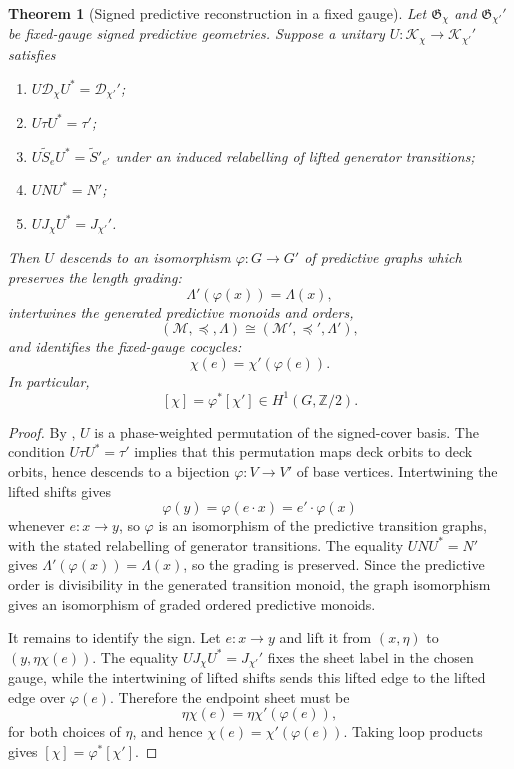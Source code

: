 \documentclass[11pt]{article}
\newtheorem{theorem}{Theorem}[section]
\theoremstyle{definition}
\theoremstyle{remark}
\newcommand{\Z}{\mathbb{Z}}
\newcommand{\Kh}{\mathcal{K}}
\newcommand{\M}{\mathcal{M}}
\newcommand{\Dd}{\mathcal{D}}
\begin{document}
\begin{theorem}[Signed predictive reconstruction in a fixed gauge]
\label{thm:reconstruction}
Let $\mathfrak G_\chi$ and $\mathfrak G_{\chi'}'$ be fixed-gauge signed
predictive geometries.  Suppose a unitary $U:\Kh_\chi\to\Kh_{\chi'}'$ satisfies
\begin{enumerate}[label=\textup{(R\arabic*)},leftmargin=2.6em]
\item $U\Dd_\chi U^*=\Dd_{\chi'}'$;
\item $U\tau U^*=\tau'$;
\item $U\widetilde S_eU^*=\widetilde S'_{e'}$ under an induced relabelling of
      lifted generator transitions;
\item $UNU^*=N'$;
\item $UJ_\chi U^*=J_{\chi'}'$.
\end{enumerate}
Then $U$ descends to an isomorphism $\varphi:G\to G'$ of predictive graphs
which preserves the length grading:
\[
  \Lambda'(\varphi(x))=\Lambda(x),
\]
intertwines the generated predictive monoids and orders,
\[
  (\M,\preceq,\Lambda)\cong(\M',\preceq',\Lambda'),
\]
and identifies the fixed-gauge cocycles:
\[
  \chi(e)=\chi'(\varphi(e)).
\]
In particular,
\[
  [\chi]=\varphi^*[\chi']\in H^1(G,\Z/2).
\]
\end{theorem}

\begin{proof}
By , $U$ is a phase-weighted permutation of the signed-cover
basis.  The condition $U\tau U^*=\tau'$ implies that this permutation maps deck
orbits to deck orbits, hence descends to a bijection
$\varphi:V\to V'$ of base vertices.  Intertwining the lifted shifts gives
\[
  \varphi(y)=\varphi(e\cdot x)=e'\cdot\varphi(x)
\]
whenever $e:x\to y$, so $\varphi$ is an isomorphism of the predictive transition
graphs, with the stated relabelling of generator transitions.  The equality
$UNU^*=N'$ gives $\Lambda'(\varphi(x))=\Lambda(x)$, so the grading is
preserved.  Since the predictive order is divisibility in the generated
transition monoid, the graph isomorphism gives an isomorphism of graded ordered
predictive monoids.

It remains to identify the sign.  Let $e:x\to y$ and lift it from
$(x,\eta)$ to $(y,\eta\chi(e))$.  The equality $UJ_\chi U^*=J_{\chi'}'$ fixes
the sheet label in the chosen gauge, while the intertwining of lifted shifts
sends this lifted edge to the lifted edge over $\varphi(e)$.  Therefore the
endpoint sheet must be
\[
  \eta\chi(e)=\eta\chi'(\varphi(e)),
\]
for both choices of $\eta$, and hence $\chi(e)=\chi'(\varphi(e))$.  Taking loop
products gives $[\chi]=\varphi^*[\chi']$.
\end{proof}
\end{document}
